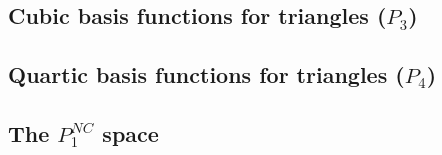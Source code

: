 \subsection{Cubic basis functions for triangles ($P_3$) \label{basis:p3}}


\subsection{Quartic basis functions for triangles ($P_4$)}







\subsection{The $P_1^{NC}$ space} \label{ss:p1nc}




